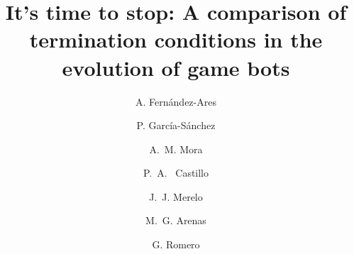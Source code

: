 \documentclass[runningheads,a4paper]{llncs}
\begin{document}
\mainmatter  %

\title{It's time to stop: A comparison of termination conditions in the evolution of game bots}


%
%
\author{A. Fern\'andez-Ares \and P. Garc\'ia-S\'anchez \and A.~M. Mora \and  P.~A.~ Castillo \and J.~J. Merelo \and M.~G. Arenas \and G. Romero}
%


%
%




\maketitle
\end{document}
